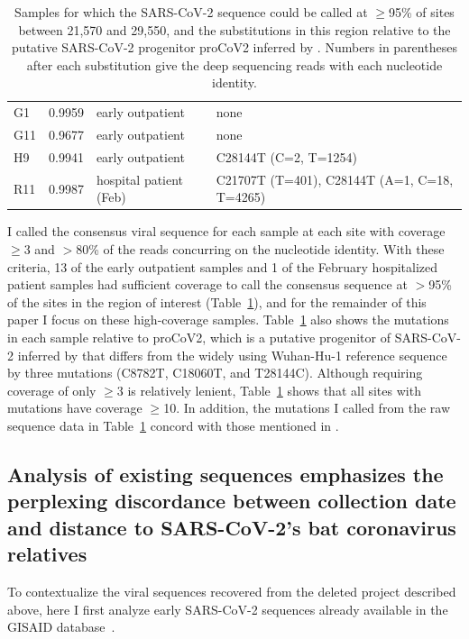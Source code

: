 \documentclass[9pt,twocolumn,twoside]{gsajnl_modified}
\begin{document}
\begin{table}[]
{\begin{tabular}{lrll}
G1 &                               0.9959 &        early outpatient &                                   none                                        \\
G11 &                               0.9677 &        early outpatient &                                  none                                         \\
H9 &                               0.9941 &        early outpatient &                                                     C28144T (C=2, T=1254)  \\
R11 &                               0.9987 &  hospital patient (Feb) &                               C21707T (T=401), C28144T (A=1, C=18, T=4265)  \\
\bottomrule
\end{tabular}
}
\caption{Samples for which the SARS-CoV-2 sequence could be called at $\ge$95\% of sites between 21,570 and 29,550, and the substitutions in this region relative to the putative SARS-CoV-2 progenitor proCoV2 inferred by \citet{kumar2021evolutionary}.
Numbers in parentheses after each substitution give the deep sequencing reads with each nucleotide identity.
\label{tab:mutations}
}
\end{table}

I called the consensus viral sequence for each sample at each site with coverage $\ge$3 and $>$80\% of the reads concurring on the nucleotide identity.
With these criteria, 13 of the early outpatient samples and 1 of the February hospitalized patient samples had sufficient coverage to call the consensus sequence at $>$95\% of the sites in the region of interest (Table~\ref{tab:mutations}), and for the remainder of this paper I focus on these high-coverage samples.
Table~\ref{tab:mutations} also shows the mutations in each sample relative to proCoV2, which is a putative progenitor of SARS-CoV-2 inferred by \citet{kumar2021evolutionary} that differs from the widely using Wuhan-Hu-1 reference sequence by three mutations (C8782T, C18060T, and T28144C).
Although requiring coverage of only $\ge$3 is relatively lenient, Table~\ref{tab:mutations} shows that all sites with mutations have coverage $\ge$10.
In addition, the mutations I called from the raw sequence data in Table~\ref{tab:mutations} concord with those mentioned in \citet{wang2020small}.

\subsection{Analysis of existing sequences emphasizes the perplexing discordance between collection date and distance to SARS-CoV-2's bat coronavirus relatives}
To contextualize the viral sequences recovered from the deleted project described above, here I first analyze early SARS-CoV-2 sequences already available in the GISAID database~\citep{shu2017gisaid}.
\end{document}
